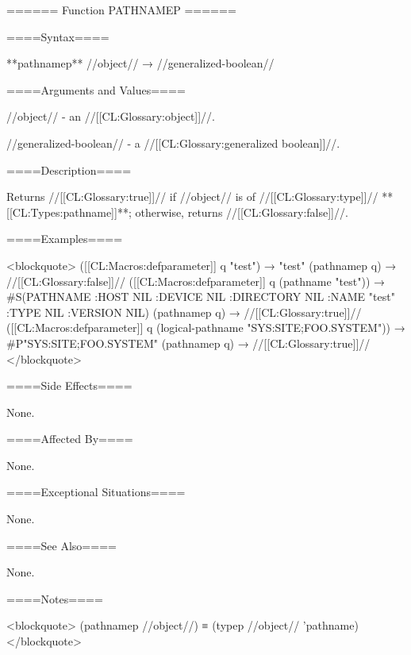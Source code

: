 ====== Function PATHNAMEP ======

====Syntax====

**pathnamep** //object// → //generalized-boolean//

====Arguments and Values====

//object// - an //[[CL:Glossary:object]]//.

//generalized-boolean// - a //[[CL:Glossary:generalized boolean]]//.

====Description====

Returns //[[CL:Glossary:true]]// if //object// is of //[[CL:Glossary:type]]// **[[CL:Types:pathname]]**; otherwise, returns //[[CL:Glossary:false]]//.

====Examples====

<blockquote> ([[CL:Macros:defparameter]] q "test") → "test" (pathnamep q) → //[[CL:Glossary:false]]// ([[CL:Macros:defparameter]] q (pathname "test")) → #S(PATHNAME :HOST NIL :DEVICE NIL :DIRECTORY NIL :NAME "test" :TYPE NIL :VERSION NIL) (pathnamep q) → //[[CL:Glossary:true]]// ([[CL:Macros:defparameter]] q (logical-pathname "SYS:SITE;FOO.SYSTEM")) → #P"SYS:SITE;FOO.SYSTEM" (pathnamep q) → //[[CL:Glossary:true]]// </blockquote>

====Side Effects====

None.

====Affected By====

None.

====Exceptional Situations====

None.

====See Also====

None.

====Notes====

<blockquote> (pathnamep //object//) ≡ (typep //object// 'pathname) </blockquote>


